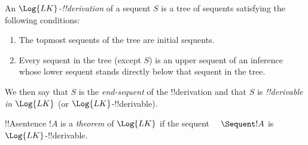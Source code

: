 \documentclass[../../include/open-logic-section]{subfiles}
\begin{document}
\begin{defn}[LK !!{derivation}]
An \emph{$\Log{LK}$-!!{derivation}} of a sequent $S$ is a tree of sequents
satisfying the following conditions:
\begin{enumerate}
\item The topmost sequents of the tree are initial sequents.
\item Every sequent in the tree (except $S$) is an upper sequent of an
  inference whose lower sequent stands directly below that sequent in
  the tree.
\end{enumerate}
We then say that $S$ is the \emph{end-sequent} of the !!{derivation} and
that $S$ is \emph{!!{derivable} in $\Log{LK}$} (or $\Log{LK}$-!!{derivable}).
\end{defn}

\begin{defn}[LK theorem]
!!A{sentence} $!A$ is a \emph{theorem} of $\Log{LK}$ if the sequent
$\quad \Sequent !A$ is $\Log{LK}$-!!{derivable}.
\end{defn}
\end{document}
